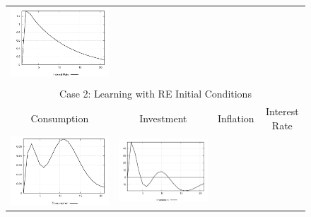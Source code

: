 \begin{figure}
\begin{tabular}{cccc}
\includegraphics[scale=0.22]{results_re/Interest_Rate_invshock_irf.png} \\ \\ 
\multicolumn{4}{c}{Case 2: Learning with RE Initial Conditions}\\
Consumption & Investment & Inflation & Interest Rate \\ 
\includegraphics[scale=0.22]{results_reallinit/Consumption_invshock_irf.png} & 
\includegraphics[scale=0.22]{results_reallinit/Investment_invshock_irf.png} & 

\end{tabular}
\end{figure}
